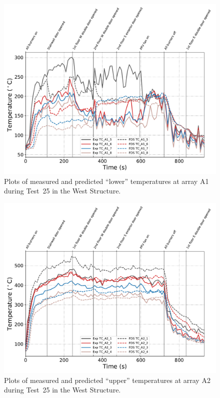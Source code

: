 \begin{figure}[!h]
	\centering
	\includegraphics[width=\columnwidth]{Figures/Plots/Validation/Temperature/Test_25_TC_A1_lower}
	\caption{Plots of measured and predicted ``lower'' temperatures at array A1 during Test~25 in the West Structure.}
	\label{fig:TCA1_lower_data_Test25}
\end{figure}

\begin{figure}[!h]
	\centering
	\includegraphics[width=\columnwidth]{Figures/Plots/Validation/Temperature/Test_25_TC_A2_upper}
	\caption{Plots of measured and predicted ``upper'' temperatures at array A2 during Test~25 in the West Structure.}
	\label{fig:TCA2_upper_data_Test25}
\end{figure}

